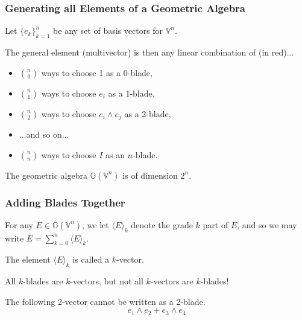 \documentclass{beamer}
\newcommand{\G}{\mathbb{G}}
\newcommand{\V}{\mathbb{V}}
\begin{document}
\begin{frame}
\frametitle{Generating all Elements of a Geometric Algebra}
Let $\{e_k\}_{k=1}^n$ be any set of basis vectors for $\V^n$.\pause

The general element (multivector) is then any linear combination of (\alert{in red})...\pause
\begin{itemize}
\item $\binom{n}{0}$ ways to choose \alert{1} as a 0-blade,\pause
\item $\binom{n}{1}$ ways to choose \alert{$e_i$} as a 1-blade,\pause
\item $\binom{n}{2}$ ways to choose \alert{$e_i\wedge e_j$} as a 2-blade,\pause
\item ...and so on...\pause
\item $\binom{n}{n}$ ways to choose \alert{$I$} as an $n$-blade.\pause
\end{itemize}
The geometric algebra $\G(\V^n)$ is of dimension $2^n$.
\end{frame}

\begin{frame}
\frametitle{Adding Blades Together}
\begin{definition}
For any $E\in\G(\V^n)$, we let $\langle E\rangle_k$ denote the grade $k$ part of $E$,
and so we may write $E = \sum_{k=0}^n\langle E\rangle_k$.
\end{definition}\pause
The element $\langle E\rangle_k$ is called a $k$-vector.\pause

All $k$-blades are $k$-vectors, but not all $k$-vectors are $k$-blades!\pause
\begin{example}
The following 2-vector cannot be written as a 2-blade.
\begin{equation*}
e_1\wedge e_2 + e_3\wedge e_4
\end{equation*}
\end{example}
\end{frame}

\end{document}
